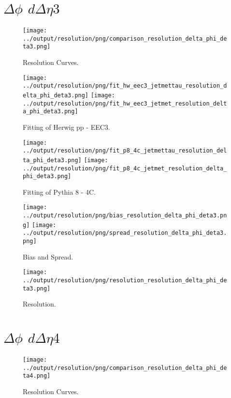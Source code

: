 \documentclass[11pt]{book}
\begin{document}
\section{$\Delta\phi$ $d\Delta\eta 3$}

\begin{figure}[ht]
\centering
\texttt{[image: ../output/resolution/png/comparison\_resolution\_delta\_phi\_deta3.png]}
\caption{Resolution Curves.}
\end{figure}


\begin{figure}[ht]
\centering
\texttt{[image: ../output/resolution/png/fit\_hw\_eec3\_jetmettau\_resolution\_delta\_phi\_deta3.png]}
\texttt{[image: ../output/resolution/png/fit\_hw\_eec3\_jetmet\_resolution\_delta\_phi\_deta3.png]}
\caption{Fitting of Herwig pp - EEC3.}
\end{figure}

\begin{figure}[ht]
\centering
\texttt{[image: ../output/resolution/png/fit\_p8\_4c\_jetmettau\_resolution\_delta\_phi\_deta3.png]}
\texttt{[image: ../output/resolution/png/fit\_p8\_4c\_jetmet\_resolution\_delta\_phi\_deta3.png]}
\caption{Fitting of Pythia 8 - 4C.}
\end{figure}

\begin{figure}[ht]
\centering
\texttt{[image: ../output/resolution/png/bias\_resolution\_delta\_phi\_deta3.png]}
\texttt{[image: ../output/resolution/png/spread\_resolution\_delta\_phi\_deta3.png]}
\caption{Bias and Spread.}
\end{figure}


\begin{figure}[ht]
\centering
\texttt{[image: ../output/resolution/png/resolution\_resolution\_delta\_phi\_deta3.png]}
\caption{Resolution.}
\end{figure}
\clearpage


\section{$\Delta\phi$ $d\Delta\eta 4$}

\begin{figure}[ht]
\centering
\texttt{[image: ../output/resolution/png/comparison\_resolution\_delta\_phi\_deta4.png]}
\caption{Resolution Curves.}
\end{figure}
\end{document}

